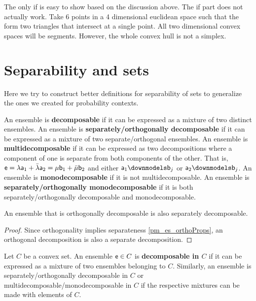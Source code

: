 \begin{remark}
	The only if is easy to show based on the discussion above. The if part does not actually work. Take 6 points in a 4 dimensional euclidean space such that the form two triangles that intersect at a single point. All two dimensional convex spaces will be segments. However, the whole convex hull is not a simplex. 
\end{remark}

\iftrue


\section{Separability and sets}

Here we try to construct better definitions for separability of sets to generalize the ones we created for probability contexts.

\begin{defn}
	An ensemble is \textbf{decomposable} if it can be expressed as a mixture of two distinct ensembles. An ensemble is \textbf{separately/orthogonally decomposable} if it can be expressed as a mixture of two separate/orthogonal ensembles. An ensemble is \textbf{multidecomposable} if it can be expressed as two decompositions where a component of one is separate from both components of the other. That is, $\ens = \lambda \ens[a]_1 + \bar{\lambda} \ens[a]_2 = \mu \ens[b]_1 +\bar{\mu} \ens[b]_2$ and either $\ens[a]_1 \separate \ens[b]_j$ or $\ens[a]_2 \separate \ens[b]_j$. An ensemble is \textbf{monodecomposable} if it is not multidecomposable. An ensemble is \textbf{separately/orthogonally monodecomposable} if it is both separately/orthogonally decomposable and monodecomposable.
\end{defn}

\begin{coro}
	An ensemble that is orthogonally decomposable is also separately decomposable.
\end{coro}

\begin{proof}
	Since orthogonality implies separateness \ref{pm_es_orthoProps}, an orthogonal decomposition is also a separate decomposition.
\end{proof}

\begin{prop}
	Let $C$ be a convex set. An ensemble $\ens \in C$ is \textbf{decomposable in $C$} if it can be expressed as a mixture of two ensembles belonging to $C$. Similarly, an ensemble is separately/orthogonally decomposable in $C$ or multidecomposable/monodecomposable in $C$ if the respective mixtures can be made with elements of $C$.
\end{prop}

